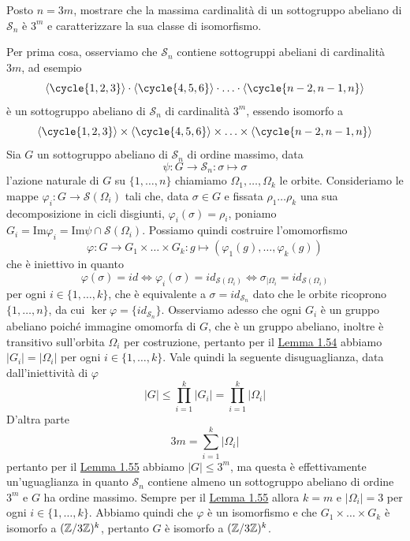 \documentclass[11pt]{scrartcl}
\begin{document}
	\begin{exercise}
		Posto $n = 3m$, mostrare che la massima cardinalità di un sottogruppo
		abeliano di $\mathcal{S}_n$ è $3^m$ e caratterizzare la sua classe di isomorfismo.
	\end{exercise}
	
	\begin{soln}
		Per prima cosa, osserviamo che $\mathcal{S}_n$ contiene sottogruppi abeliani di
		cardinalità $3m$, ad esempio
		\[
		\langle\cycle{1, 2, 3}\rangle\cdot \langle\cycle{4, 5, 6}\rangle
		\cdot \ldots \cdot \langle\cycle{n - 2, n - 1, n}\rangle
		\]
		è un sottogruppo abeliano di $\mathcal{S}_n$ di cardinalità $3^m$, essendo 
		isomorfo a
		\[
		\langle\cycle{1, 2, 3}\rangle\times\langle\cycle{4, 5, 6}\rangle
		\times\ldots\times\langle\cycle{n - 2, n - 1, n}\rangle
		\]
		Sia $G$ un sottogruppo abeliano di $\mathcal{S}_n$ di ordine massimo, data
		\[
		\psi: G\longrightarrow \mathcal{S}_n : \sigma \longmapsto \sigma
		\]
		l'azione naturale di $G$ su $\{1, \ldots, n\}$ chiamiamo $\Omega_1, \ldots, \Omega_k$
		le orbite. Consideriamo le mappe $\varphi_i : G \longrightarrow \mathcal{S}(\Omega_i)$
		tali che, data $\sigma \in G$ e fissata $\rho_1\ldots\rho_k$ una sua decomposizione
		in cicli disgiunti, $\varphi_i(\sigma) = \rho_i$, poniamo $G_i = \mathrm{Im}\varphi_i=
		\mathrm{Im}\psi \cap \mathcal{S}(\Omega_i)$. Possiamo quindi costruire l'omomorfismo
		\[
		\varphi: G \longrightarrow G_1\times \ldots \times G_k : g \longmapsto (\varphi_1(g), \ldots, \varphi_k(g))
		\]
		che è iniettivo in quanto 
		\[
		\varphi(\sigma) = id \iff \varphi_i(\sigma) = id_{\mathcal{S}(\Omega_i)} \iff 
		\sigma_{\mid \Omega_i} = id_{\mathcal{S}(\Omega_i)}
		\]
		per ogni $i \in \{1, \ldots, k\}$, che è equivalente a $\sigma = id_{\mathcal{S}_n}$
		dato che le orbite ricoprono $\{1, \ldots, n\}$, da cui $\ker\varphi = 
		\{id_{\mathcal{S}_n}\}$. Osserviamo adesso che ogni $G_i$ è un gruppo abeliano poiché
		immagine omomorfa di $G$, che è un gruppo abeliano, inoltre è transitivo
		sull'orbita $\Omega_i$ per costruzione, pertanto per il 
		\hyperref[lemma1.54]{Lemma 1.54} abbiamo $|G_i| = |\Omega_i|$ per ogni 
		$i \in \{1, \ldots, k\}$. Vale quindi la seguente disuguaglianza, data
		dall'iniettività di $\varphi$
		\[
		|G| \leqslant \prod_{i = 1}^k|G_i| = \prod_{i = 1}^k |\Omega_i|
		\]
		D'altra parte
		\[
		3m = \sum_{i = 1}^k|\Omega_i|
		\]pertanto per il \hyperref[lemma1.55]{Lemma 1.55} abbiamo $|G| \leq 3^m$, 
		ma questa è effettivamente un'uguaglianza in quanto $\mathcal{S}_n$ contiene
		almeno un sottogruppo abeliano di ordine $3^m$ e $G$ ha ordine massimo.
		Sempre per il \hyperref[lemma1.55]{Lemma 1.55} allora $k = m$ e $|\Omega_i| = 3$
		per ogni $i \in \{1, \ldots, k\}$. Abbiamo quindi che $\varphi$ è un isomorfismo
		e che $G_1\times\ldots\times G_k$ è isomorfo a $(\mathbb{Z}/{3}\mathbb{Z})^k$, pertanto
		$G$ è isomorfo a $(\mathbb{Z}/{3}\mathbb{Z})^k$.
	\end{soln}
	
\end{document}
